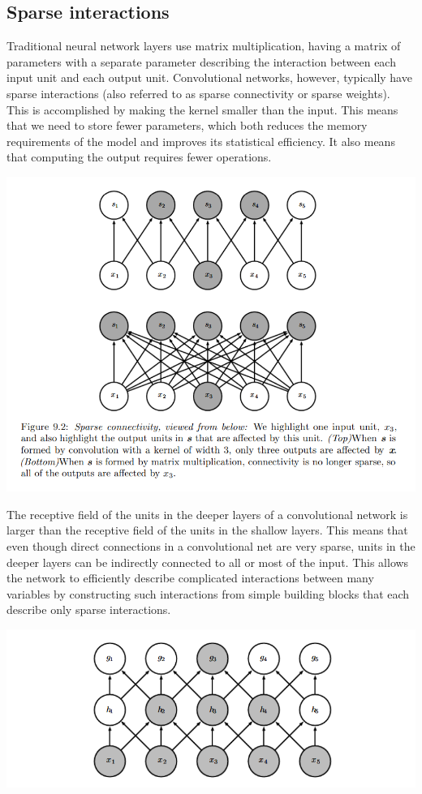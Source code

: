 \subsection{Sparse interactions}
Traditional neural network layers use matrix multiplication, having a matrix of parameters with a separate parameter describing the interaction between each input unit and each output unit. Convolutional networks, however, typically have sparse interactions (also referred to as sparse connectivity or sparse weights). This is accomplished by making the kernel smaller than the input. This means that we need to store fewer parameters, which both reduces the
memory requirements of the model and improves its statistical efficiency. It also means that computing the output requires fewer operations.
\begin{center}
    \includegraphics[scale = 0.7]{images/Sparse-conn.png}
\end{center}
The receptive field of the units in the deeper layers of a convolutional network is larger than the receptive field of the units in the shallow layers. This means that even though direct connections in a convolutional net are very sparse, units in the deeper layers can be indirectly connected to all or most of the input. This allows the network to efficiently describe complicated interactions between many variables by constructing such interactions from simple building blocks that each describe only sparse interactions.
\begin{center}
    \includegraphics[scale=0.7]{images/receptive field.png}
\end{center}

